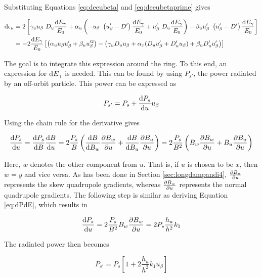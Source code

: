 Substituting Equations \eqref{eq:deeubeta} and \eqref{eq:deeubetaprime} gives

\begin{align}
    \text{d} \epsilon_u &= 2 \left[ \gamma_u u_\beta\ D_u \frac{\text{d} E_\gamma}{E_0} + \alpha_u \left(- u_\beta\ \left( u_\beta' - D' \right) \frac{\text{d} E_\gamma}{E_0} + u_\beta'\ D_u \frac{\text{d} E_\gamma}{E_0} \right) - \beta_u u_\beta'\ \left( u_\beta' - D' \right) \frac{\text{d} E_\gamma}{E_0} \right]\\
                    &= -2 \frac{\text{d} E_\gamma}{E_0} \left[ \left( \alpha_u u_\beta u_\beta' + \beta_u u_\beta'^2 \right)  - \left( \gamma_u D_u u_\beta + \alpha_x (D_u u_\beta' + D_u' u_\beta) + \beta_u D_u' u_\beta' \right)\right]
    \label{eq:changeinemittance}
\end{align}

The goal is to integrate this expression around the ring. To this end, an expression for $\text{d} E_\gamma$ is needed. This can be found by using $P_{s'}$, the power radiated by an off-orbit particle. This power can be expressed as

\begin{equation}
    P_{s'} = P_s + \frac{\text{d} {P_s}}{\text{d} {u}} u_\beta
\end{equation}

Using the chain rule for the derivative gives

\begin{equation}
    \frac{\text{d} {P_s}}{\text{d} {u}} = \frac{\text{d} {P_s}}{\text{d} {B}} \frac{\text{d} {B}}{\text{d} {u}} = 2\frac{P_s}{B} \left( \frac{\text{d} {B}}{\text{d} {B_w}} \frac{\partial {B_w}}{\partial {u}} + \frac{\text{d} {B}}{\text{d} {B_u}} \frac{\partial {B_u}}{\partial {u}} \right) = 2 \frac{P_s}{B^2} \left( B_w \frac{\partial {B_w}}{\partial {u}} + B_u \frac{\partial {B_u}}{\partial {u}} \right)
\end{equation}

Here, $w$ denotes the other component from $u$. That is, if $u$ is chosen to be $x$, then $w = y$ and vice versa. As has been done in Section \ref{sec:longdampandi4}, $\frac{\partial {B_u}}{\partial {u}}$ represents the skew quadrupole gradients, whereas $\frac{\partial {B_w}}{\partial {u}}$ represents the normal quadrupole gradients. The following step is similar as deriving Equation \eqref{eq:dPdE}, which results in

\begin{equation}
    \frac{\text{d} {P_s}}{\text{d} {u}} = 2 \frac{P_s}{B^2} B_w \frac{\partial {B_w}}{\partial {u}} = 2 P_s \frac{h_u}{h^2} k_1
\end{equation}

The radiated power then becomes

\begin{equation}
    P_{s'} = P_s \left[ 1 + 2 \frac{h_u}{h^2} k_1 u_\beta \right]
\end{equation}

